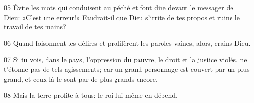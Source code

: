
05 Évite les mots qui conduisent au péché et font dire devant le messager de Dieu: «C’est une erreur!» Faudrait-il que Dieu s’irrite de tes propos et ruine le travail de tes mains?

06 Quand foisonnent les délires et prolifèrent les paroles vaines, alors, crains Dieu.

07 Si tu vois, dans le pays, l’oppression du pauvre, le droit et la justice violés, ne t’étonne pas de tels agissements; car un grand personnage est couvert par un plus grand, et ceux-là le sont par de plus grands encore.

08 Mais la terre profite à tous: le roi lui-même en dépend.
